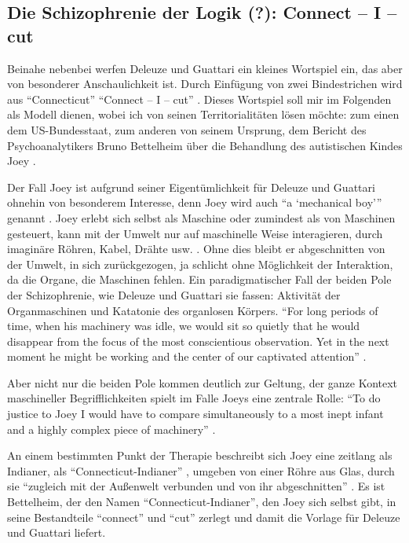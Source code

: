 \documentclass[12pt,
               DIV13,
               paper=a4,
               twoside=false,
               onehalfspacing,
               bibliography=totoc,
               toc=graduated,
               draft,
               ]{scrartcl}
\newcommand{\pc}[2]{\parencite[#1]{#2}}
\newcommand{\vgl}[2]{\parencite[vgl.][#1]{#2}}
\newcommand{\worries}[1]{\ifdraft{\textcolor{blue}{\texttt{(#1)}}}{}}
\newcommand{\gwg}{G--W--G'\xspace}
\newcommand{\cic}{Connect -- I -- cut\xspace}
\newcommand{\dg}{Deleuze und Guattari\xspace}
\begin{document}


\subsection{Die Schizophrenie der Logik (?): \cic}

%

Beinahe nebenbei werfen \dg ein kleines Wortspiel ein, das aber von
besonderer Anschaulichkeit ist. Durch Einfügung von zwei Bindestrichen
wird aus "`Connecticut"' "`\cic"' \pc{48}{ao}. Dieses Wortspiel soll
mir im Folgenden als Modell dienen, wobei ich von seinen
Territorialitäten lösen möchte: zum einen dem US-Bundesstaat, zum
anderen von seinem Ursprung, dem Bericht des Psychoanalytikers Bruno
Bettelheim über die Behandlung des autistischen Kindes Joey
\parencites[vgl.][]{joey}[306-446]{emptyf}.

Der Fall Joey ist aufgrund seiner Eigentümlichkeit für \dg ohnehin von
besonderem Interesse, denn Joey wird auch \enquote{a
\enquote{mechanical boy}} genannt \pc{3}{joey}. Joey erlebt sich
selbst als Maschine oder zumindest als von Maschinen gesteuert, kann
mit der Umwelt nur auf maschinelle Weise interagieren, durch imaginäre
Röhren, Kabel, Drähte usw. \vgl{3}{joey}. Ohne dies bleibt er
abgeschnitten von der Umwelt, in sich zurückgezogen, ja schlicht ohne
Möglichkeit der Interaktion, da die  Organe, die Maschinen fehlen. Ein
paradigmatischer Fall der beiden Pole der Schizophrenie, wie \dg sie
fassen: Aktivität der Organmaschinen und Katatonie des organlosen
Körpers. "`For long periods of time, when his \glq machinery\grq{} was
idle, we would sit so quietly that he would disappear from the focus
of the most conscientious observation. Yet in the next moment he might
be \glq working\grq{} and the center of our captivated attention"'
\pc{3}{joey}.

Aber nicht nur die beiden Pole kommen deutlich zur Geltung, der ganze
Kontext maschineller Begrifflichkeiten spielt im Falle Joeys eine
zentrale Rolle: "`To do justice to Joey I would have to compare
simultaneously to a most inept infant and a highly complex piece of
machinery"' \pc{3}{joey}.

An einem bestimmten Punkt der Therapie \vgl{398-404}{emptyf}
beschreibt sich Joey eine zeitlang als Indianer, als
"`Connecticut-Indianer"' \pc{399}{emptyf}, umgeben von einer Röhre aus
Glas, durch sie "`zugleich mit der Außenwelt verbunden und von ihr
abgeschnitten"' \pc{399}{emptyf}. Es ist Bettelheim, der den Namen
"`Connecticut-Indianer"', den Joey sich selbst gibt, in seine
Bestandteile "`connect"' und "`cut"' zerlegt \vgl{399}{emptyf} und
damit die Vorlage für \dg liefert.
\end{document}

